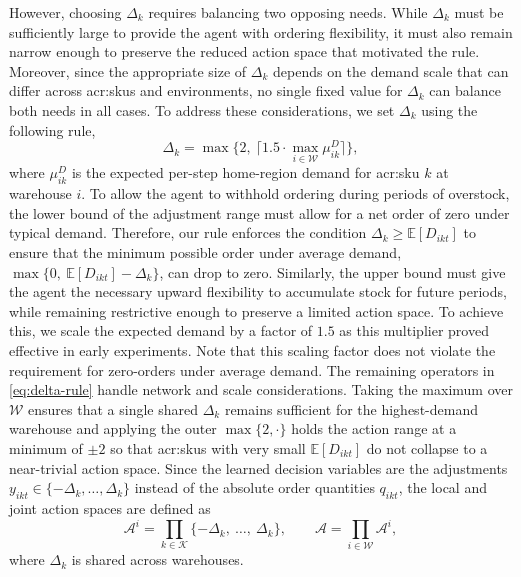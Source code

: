 However, choosing $\Delta_k$ requires balancing two opposing needs. While $\Delta_k$ must be sufficiently large to provide the agent with ordering flexibility, it must also remain narrow enough to preserve the reduced action space that motivated the rule. Moreover, since the appropriate size of $\Delta_k$ depends on the demand scale that can differ across \glspl{acr:sku} and environments, no single fixed value for $\Delta_k$ can balance both needs in all cases. To address these considerations, we set $\Delta_k$ using the following rule, 
\begin{equation}
\label{eq:delta-rule}
  \Delta_k = \max\!\big\{2,\ \lceil 1.5 \cdot \max_{i \in {\mathcal{W}}}\mu^{D}_{ik} \rceil\big\},
\end{equation}
where $\mu^{D}_{ik}$ is the expected per-step home-region demand for \gls{acr:sku} $k$ at warehouse $i$. To allow the agent to withhold ordering during periods of overstock, the lower bound of the adjustment range must allow for a net order of zero under typical demand. Therefore, our rule enforces the condition $\Delta_k \ge \mathbb{E}[D_{ikt}]$ to ensure that the minimum possible order under average demand, $\max\!\big\{0,\ \mathbb{E}[D_{ikt}] - \Delta_k\big\}$, can drop to zero. Similarly, the upper bound must give the agent the necessary upward flexibility to accumulate stock for future periods, while remaining restrictive enough to preserve a limited action space. To achieve this, we scale the expected demand by a factor of $1.5$ as this multiplier proved effective in early experiments. Note that this scaling factor does not violate the requirement for zero-orders under average demand. The remaining operators in \autoref{eq:delta-rule} handle network and scale considerations. Taking the maximum over $\mathcal{W}$ ensures that a single shared $\Delta_k$ remains sufficient for the highest-demand warehouse and applying the outer $\max\{2,\cdot\}$ holds the action range at a minimum of $\pm2$ so that \glspl{acr:sku} with very small $\mathbb{E}[D_{ikt}]$ do not collapse to a near-trivial action space.
Since the learned decision variables are the adjustments $y_{ikt}\in\{-\Delta_k,\dots,\Delta_k\}$ instead of the absolute order quantities $q_{ikt}$, the local and joint action spaces are defined as
\begin{equation}
\label{eq:action-spaces}
  \mathcal{A}^i = \prod_{k \in \mathcal{K}} \{-\Delta_k,\ \dots,\ \Delta_k\}, \qquad \mathcal{A} = \prod_{i \in \mathcal{W}} \mathcal{A}^i,
\end{equation}
where $\Delta_k$ is shared across warehouses.\\


